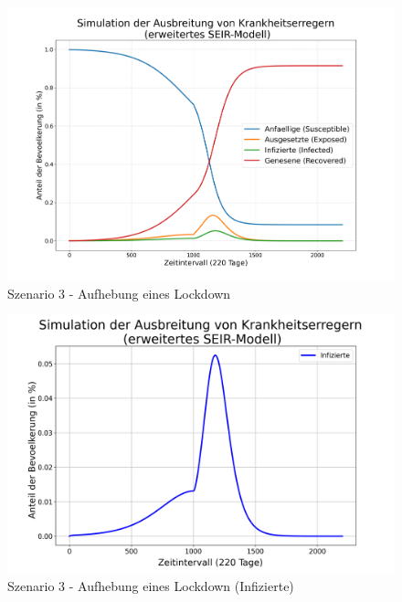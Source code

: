 \documentclass[12pt]{article}
\begin{document}
\begin{figure}[H]
\centering
\includegraphics[scale=0.4]{Szenario_3}
\caption{Szenario 3 - Aufhebung eines Lockdown}
\label{fig:szenario_3}
\end{figure}

\begin{figure}[H]
\centering
\includegraphics[scale=0.4]{Szenario_3_Infizierte}
\caption{Szenario 3 - Aufhebung eines Lockdown (Infizierte)}
\label{fig:szenario_3_Infizierte}
\end{figure}
\end{document}
